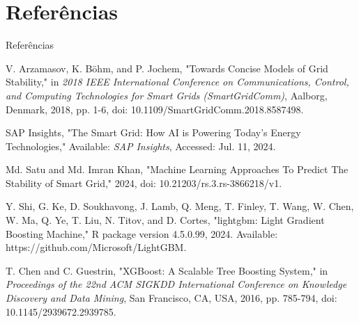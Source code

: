 \documentclass{beamer}
\begin{document}
\section{Referências}

\begin{frame}{Referências}

    \begin{footnotesize}
        \begin{thebibliography}{1}

            V. Arzamasov, K. Böhm, and P. Jochem, "Towards Concise Models of Grid Stability," in \textit{2018 IEEE International Conference on Communications, Control, and Computing Technologies for Smart Grids (SmartGridComm)}, Aalborg, Denmark, 2018, pp. 1-6, doi: 10.1109/SmartGridComm.2018.8587498.

            SAP Insights, "The Smart Grid: How AI is Powering Today’s Energy Technologies," Available: \textit{SAP Insights}, Accessed: Jul. 11, 2024.

            Md. Satu and Md. Imran Khan, "Machine Learning Approaches To Predict The Stability of Smart Grid," 2024, doi: 10.21203/rs.3.rs-3866218/v1.

            Y. Shi, G. Ke, D. Soukhavong, J. Lamb, Q. Meng, T. Finley, T. Wang, W. Chen, W. Ma, Q. Ye, T. Liu, N. Titov, and D. Cortes, "lightgbm: Light Gradient Boosting Machine," R package version 4.5.0.99, 2024. Available: https://github.com/Microsoft/LightGBM.

            T. Chen and C. Guestrin, "XGBoost: A Scalable Tree Boosting System," in \textit{Proceedings of the 22nd ACM SIGKDD International Conference on Knowledge Discovery and Data Mining}, San Francisco, CA, USA, 2016, pp. 785-794, doi: 10.1145/2939672.2939785.

        \end{thebibliography}
    \end{footnotesize}
\end{frame}
\end{document}
